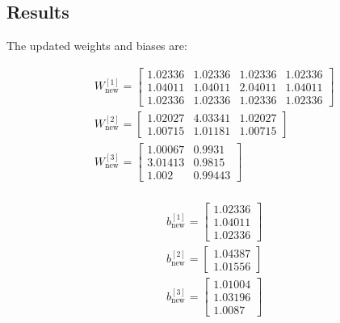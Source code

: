 \documentclass{article}
\begin{document}
\subsection*{Results}

The updated weights and biases are:

\setlength{\columnseprule}{0pt}
\begin{multicols}{2}

\begin{center}
    \begin{align*}
        &W^{[1]}_{\text{new}} = \begin{bmatrix} 1.02336 & 1.02336 & 1.02336 & 1.02336 \\  1.04011 & 1.04011 & 2.04011 & 1.04011 \\  1.02336 & 1.02336 & 1.02336 & 1.02336\end{bmatrix} \\  
        &W^{[2]}_{\text{new}} = \begin{bmatrix} 1.02027 & 4.03341 & 1.02027 \\  1.00715 & 1.01181 & 1.00715  \end{bmatrix} \\
        &W^{[3]}_{\text{new}} = \begin{bmatrix} 1.00067 & 0.9931  \\  3.01413 & 0.9815  \\  1.002   & 0.99443  \end{bmatrix} \\
    \end{align*}
\end{center}


\columnbreak

\begin{center}
    \begin{align*}
        &b^{[1]}_{\text{new}} = \begin{bmatrix} 1.02336 \\  1.04011 \\  1.02336\end{bmatrix} \\
        &b^{[2]}_{\text{new}} = \begin{bmatrix} 1.04387 \\  1.01556\end{bmatrix} \\
        &b^{[3]}_{\text{new}} = \begin{bmatrix} 1.01004 \\  1.03196 \\  1.0087 \end{bmatrix} \\
    \end{align*}
\end{center}


\end{multicols}
\end{document}
